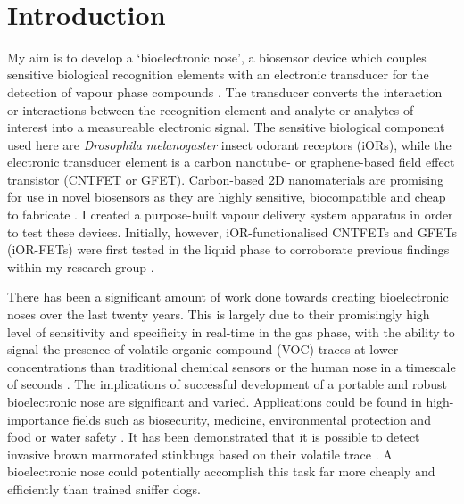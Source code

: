 \documentclass[
  a4paper,
]{scrbook}
\begin{document}
\clearpage
\newpage
\thispagestyle{empty} %
\mbox{~}
\clearpage
\newpage

\mainmatter
{}

\hypertarget{introduction}{%
\chapter{Introduction}\label{introduction}}

My aim is to develop a `bioelectronic nose', a biosensor device which
couples sensitive biological recognition elements with an electronic
transducer for the detection of vapour phase compounds
\autocite{Lee2010,Dung2018,Moon2020}. The transducer converts the
interaction or interactions between the recognition element and analyte
or analytes of interest into a measureable electronic signal. The
sensitive biological component used here are \emph{Drosophila
melanogaster} insect odorant receptors (iORs), while the electronic
transducer element is a carbon nanotube- or graphene-based field effect
transistor (CNTFET or GFET). Carbon-based 2D nanomaterials are promising
for use in novel biosensors as they are highly sensitive, biocompatible
and cheap to fabricate \autocite{Shkodra2021}. I created a purpose-built
vapour delivery system apparatus in order to test these devices.
Initially, however, iOR-functionalised CNTFETs and GFETs (iOR-FETs) were
first tested in the liquid phase to corroborate previous findings within
my research group \autocite{Murugathas2019a,Murugathas2020}.

There has been a significant amount of work done towards creating
bioelectronic noses over the last twenty years. This is largely due to
their promisingly high level of sensitivity and specificity in real-time
in the gas phase, with the ability to signal the presence of volatile
organic compound (VOC) traces at lower concentrations than traditional
chemical sensors or the human nose in a timescale of seconds
\autocite{Lee2010,Moon2020,Terutsuki2020}. The implications of
successful development of a portable and robust bioelectronic nose are
significant and varied. Applications could be found in high-importance
fields such as biosecurity, medicine, environmental protection and food
or water safety \autocite{Dung2018,Arakawa2019,Yang2017,Son2017}. It has
been demonstrated that it is possible to detect invasive brown
marmorated stinkbugs based on their volatile trace \autocite{Moser2020}.
A bioelectronic nose could potentially accomplish this task far more
cheaply and efficiently than trained sniffer dogs.
\end{document}

